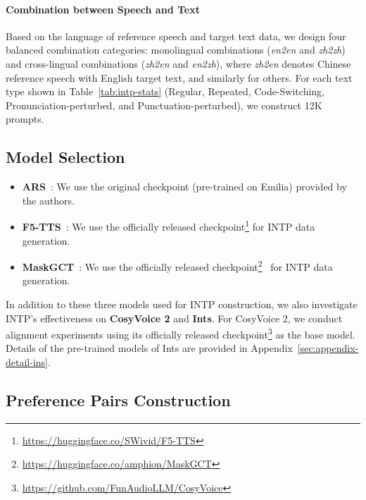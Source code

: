 \documentclass[11pt]{article}
\begin{document}
\paragraph{Combination between Speech and Text}

Based on the language of reference speech and target text data, we design four balanced combination categories: monolingual combinations (\textit{en2en} and \textit{zh2zh}) and cross-lingual combinations (\textit{zh2en} and \textit{en2zh}), where \textit{zh2en} denotes Chinese reference speech with English target text, and similarly for others. For each text type shown in Table~\ref{tab:intp-stats} (Regular, Repeated, Code-Switching, Pronunciation-perturbed, and Punctuation-perturbed), we construct 12K prompts.

\subsection{Model Selection}\label{sec:appendix-model-selection}

\begin{itemize}[itemsep=0ex,leftmargin=2ex]
    \item \textbf{ARS}~\cite{maskgct}: We use the original checkpoint (pre-trained on Emilia) provided by the authors.
    \item \textbf{F5-TTS}~\cite{f5tts}: We use the officially released checkpoint\footnote{\href{https://huggingface.co/SWivid/F5-TTS}{https://huggingface.co/SWivid/F5-TTS}} for INTP data generation.
    \item \textbf{MaskGCT}~\cite{maskgct}: We use the officially released checkpoint\footnote{\href{https://huggingface.co/amphion/MaskGCT}{https://huggingface.co/amphion/MaskGCT}}~\cite{amphion,amphion_v0.2} for INTP data generation.
\end{itemize}

In addition to these three models used for INTP construction, we also investigate INTP's effectiveness on \textbf{CosyVoice 2} and \textbf{Ints}. For CosyVoice 2, we conduct alignment experiments using its officially released checkpoint\footnote{\href{https://github.com/FunAudioLLM/CosyVoice}{https://github.com/FunAudioLLM/CosyVoice}} as the base model. Details of the pre-trained models of Ints are provided in Appendix~\ref{sec:appendix-detail-ins}.


\subsection{Preference Pairs Construction}\label{sec:appendix-preference-pairs}
\end{document}
